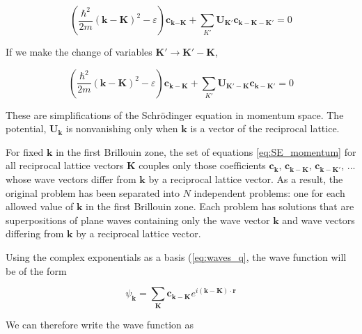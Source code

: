 	\begin{equation} \label{eq:q_2}
		\left(
		\frac{\hbar^2}{2m}
		(\mathbf{k} - \mathbf{K})^2 - \varepsilon
		\right) \boldsymbol{c}_{\mathbf{k {-K}}}
		+ \sum_{K'} \boldsymbol{U}_\mathbf{K'}
		\boldsymbol{c}_\mathbf{k-K-K'}
		= 0
	\end{equation}

	If we make the change of variables  $\mathbf{K'}\rightarrow \mathbf{K'-K}$,

	\begin{equation} \label{eq:SE_momentum}
		\left(
		\frac{\hbar^2}{2m}
		(\mathbf{k-\mathbf{K}})^2 - \varepsilon
		\right) \boldsymbol{c}_{\mathbf{k-K}}
		+ \sum_{K'} \boldsymbol{U}_{\mathbf{K'-K}}
		\boldsymbol{c}_{\mathbf{k-K'}}
		= 0
	\end{equation}

	These are simplifications of the Schrödinger equation in momentum space.  The potential, $\boldsymbol{U}_\mathbf{k}$ is nonvanishing only when $\boldsymbol{k}$ is a vector of the reciprocal lattice.

	For fixed $\mathbf{k}$ in the first Brillouin zone, the set of equations \ref{eq:SE_momentum} for all reciprocal lattice vectors $\mathbf{K}$ couples only those coefficients $\boldsymbol{c}_\mathbf{k}$, $\boldsymbol{c}_\mathbf{k-K}$, $\boldsymbol{c}_\mathbf{k-K'}$, ... whose wave vectors differ from $\mathbf{k}$ by a reciprocal lattice vector. As a result, the original problem has been separated into $N$ independent problems: one for each allowed value of $\mathbf{k}$ in the first Brillouin zone. Each problem has solutions that are superpositions of plane waves containing only the wave vector $\mathbf{k}$ and wave vectors differing from $\mathbf{k}$ by a reciprocal lattice vector. 

	Using the complex exponentials as a basis (\ref{eq:waves_q}, the wave function will be of the form

	\begin{equation} \label{eq:waves_k}
		\psi_{\mathbf{k}}
		= \sum_{\boldsymbol{K}}
		\boldsymbol{c}_{\mathbf{k-K}}
		e^{i(\mathbf{k-K}) \cdot \mathbf{r}}
	\end{equation}

	We can therefore write the wave function as 

